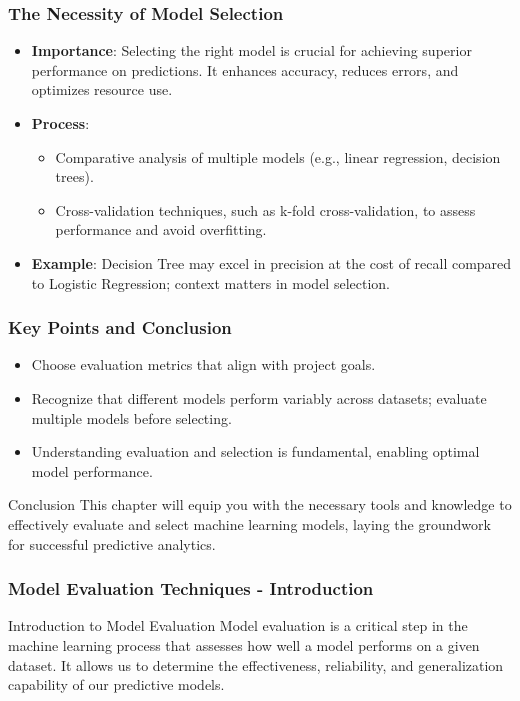 \documentclass{beamer}
\begin{document}
\begin{frame}[fragile]
    \frametitle{The Necessity of Model Selection}
    \begin{itemize}
        \item \textbf{Importance}: Selecting the right model is crucial for achieving superior performance on predictions. It enhances accuracy, reduces errors, and optimizes resource use.
        \item \textbf{Process}:
            \begin{itemize}
                \item Comparative analysis of multiple models (e.g., linear regression, decision trees).
                \item Cross-validation techniques, such as k-fold cross-validation, to assess performance and avoid overfitting.
            \end{itemize}
        \item \textbf{Example}: Decision Tree may excel in precision at the cost of recall compared to Logistic Regression; context matters in model selection.
    \end{itemize}
\end{frame}

\begin{frame}[fragile]
    \frametitle{Key Points and Conclusion}
    \begin{itemize}
        \item Choose evaluation metrics that align with project goals.
        \item Recognize that different models perform variably across datasets; evaluate multiple models before selecting.
        \item Understanding evaluation and selection is fundamental, enabling optimal model performance.
    \end{itemize}
    \begin{block}{Conclusion}
        This chapter will equip you with the necessary tools and knowledge to effectively evaluate and select machine learning models, laying the groundwork for successful predictive analytics.
    \end{block}
\end{frame}

\begin{frame}[fragile]
    \frametitle{Model Evaluation Techniques - Introduction}
    \begin{block}{Introduction to Model Evaluation}
        Model evaluation is a critical step in the machine learning process that assesses how well a model performs on a given dataset. It allows us to determine the effectiveness, reliability, and generalization capability of our predictive models.
    \end{block}
\end{frame}
\end{document}
